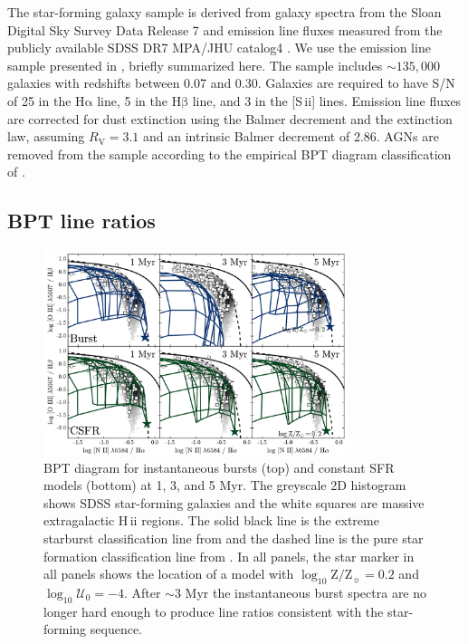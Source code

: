 \documentclass[twocolumn, tighten]{aastex61}
\newcommand{\logten}{\ensuremath{\log_{10}}}
\newcommand{\sii}{[S\,{\sc ii}]\xspace}
\newcommand{\ha}{\ensuremath{\mathrm{H\alpha}}}
\newcommand{\hb}{\ensuremath{\mathrm{H\beta}}}
\newcommand{\hii}{H\,{\sc ii}\xspace}
\newcommand{\logZeq}[1]{\ensuremath{\logten \mathrm{Z}/\mathrm{Z}_{\sun} = #1}}
\newcommand{\logU}{\ensuremath{\logten \mathcal{U}_0}}
\begin{document}
The star-forming galaxy sample is derived from galaxy spectra from the Sloan Digital Sky Survey Data Release 7 \citep[SDSS DR7;][]{York00, Abazajian09} and emission line fluxes measured from the publicly available SDSS DR7 MPA/JHU catalog4 \citep{Kauffmann03a, Brinchmann04, Salim07}. We use the emission line sample presented in \citet{Telford16}, briefly summarized here. The sample includes $\sim 135,000$ galaxies with redshifts between 0.07 and 0.30. Galaxies are required to have S/N of 25 in the \ha{} line, 5 in the \hb{} line, and 3 in the \sii{} lines. Emission line fluxes are corrected for dust extinction using the Balmer decrement and the \citet{Cardelli89} extinction law, assuming $R_{\mathrm{V}} = 3.1$ and an intrinsic Balmer decrement of 2.86. AGNs are removed from the sample according to the empirical BPT diagram classification of \citet{Kauffmann03b}.

\subsection{BPT line ratios}\label{sec:models:diagnostics:BPT}
\begin{figure}[ht!]
    \begin{centering}
        \includegraphics[width=0.8\textwidth]{f16.pdf}
        \caption{BPT diagram for instantaneous bursts (top) and constant SFR models (bottom) at 1, 3, and 5 Myr. The greyscale 2D histogram shows SDSS star-forming galaxies and the white squares are massive extragalactic \hii regions. The solid black line is the extreme starburst classification line from \citet{Kewley01} and the dashed line is the pure star formation classification line from \citet{Kauffmann03a}. In all panels, the star marker in all panels shows the location of a model with \logZeq{0.2} and $\logU=-4$. After $\sim3$ Myr the instantaneous burst spectra are no longer hard enough to produce line ratios consistent with the star-forming sequence.}
        \label{fig:BPTage}
    \end{centering}
\end{figure}
\end{document}
